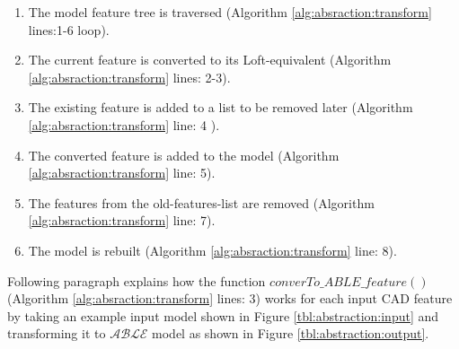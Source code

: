 \begin{enumerate}
[noitemsep,topsep=2pt,parsep=2pt,partopsep=2pt]
\item The model feature tree is traversed (Algorithm \ref{alg:absraction:transform} lines:1-6 loop). 
\item  The current feature is converted to its Loft-equivalent (Algorithm \ref{alg:absraction:transform} lines: 2-3). 
\item The existing feature is added to a list to be removed later (Algorithm \ref{alg:absraction:transform} line: 4 ). 
\item The converted feature is added to the model (Algorithm \ref{alg:absraction:transform} line: 5). 
\item The features from the old-features-list are removed (Algorithm \ref{alg:absraction:transform} line: 7). 
\item The model is rebuilt (Algorithm \ref{alg:absraction:transform} line: 8).
\end{enumerate}


Following paragraph explains how the function $converTo\_ABLE\_feature()$ (Algorithm \ref{alg:absraction:transform} lines: 3) works for each input CAD feature by taking an example input model shown in Figure \ref{tbl:abstraction:input} and transforming it to $\mathcal{ABLE}$ model as shown in Figure \ref{tbl:abstraction:output}.

